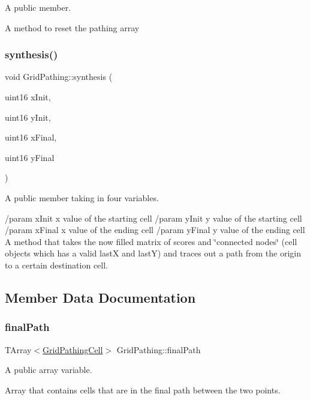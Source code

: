 A public member. 

A method to reset the pathing array \hypertarget{class_grid_pathing_a1cad627b7af6d693e2b6fbabae4a54cc}{}\label{class_grid_pathing_a1cad627b7af6d693e2b6fbabae4a54cc} 
\subsubsection{\texorpdfstring{synthesis()}{synthesis()}}
{\footnotesize\ttfamily void Grid\+Pathing\+::synthesis (\begin{DoxyParamCaption}\item[{uint16}]{x\+Init,  }\item[{uint16}]{y\+Init,  }\item[{uint16}]{x\+Final,  }\item[{uint16}]{y\+Final }\end{DoxyParamCaption})}



A public member taking in four variables. 

/param x\+Init x value of the starting cell /param y\+Init y value of the starting cell /param x\+Final x value of the ending cell /param y\+Final y value of the ending cell A method that takes the now filled matrix of scores and \char`\"{}connected nodes\char`\"{} (cell objects which has a valid lastX and lastY) and traces out a path from the origin to a certain destination cell. 

\subsection{Member Data Documentation}
\hypertarget{class_grid_pathing_a5f136ffddfd481828d8e3bd4bd68c469}{}\label{class_grid_pathing_a5f136ffddfd481828d8e3bd4bd68c469} 
\subsubsection{\texorpdfstring{final\+Path}{finalPath}}
{\footnotesize\ttfamily T\+Array$<$\hyperlink{class_grid_pathing_cell}{Grid\+Pathing\+Cell}$>$ Grid\+Pathing\+::final\+Path}



A public array variable. 

Array that contains cells that are in the final path between the two points. \hypertarget{class_grid_pathing_a7dd028322c2248c079d5c9aff06389e3}{}\label{class_grid_pathing_a7dd028322c2248c079d5c9aff06389e3} 
